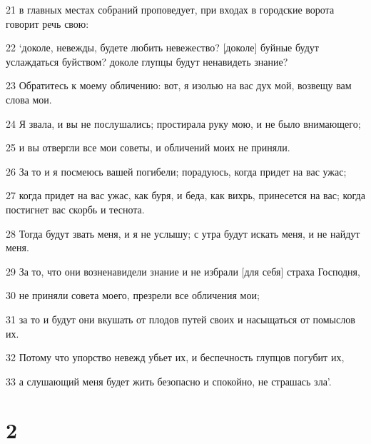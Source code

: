\par 21 в главных местах собраний проповедует, при входах в городские ворота говорит речь свою:
\par 22 `доколе, невежды, будете любить невежество? [доколе] буйные будут услаждаться буйством? доколе глупцы будут ненавидеть знание?
\par 23 Обратитесь к моему обличению: вот, я изолью на вас дух мой, возвещу вам слова мои.
\par 24 Я звала, и вы не послушались; простирала руку мою, и не было внимающего;
\par 25 и вы отвергли все мои советы, и обличений моих не приняли.
\par 26 За то и я посмеюсь вашей погибели; порадуюсь, когда придет на вас ужас;
\par 27 когда придет на вас ужас, как буря, и беда, как вихрь, принесется на вас; когда постигнет вас скорбь и теснота.
\par 28 Тогда будут звать меня, и я не услышу; с утра будут искать меня, и не найдут меня.
\par 29 За то, что они возненавидели знание и не избрали [для себя] страха Господня,
\par 30 не приняли совета моего, презрели все обличения мои;
\par 31 за то и будут они вкушать от плодов путей своих и насыщаться от помыслов их.
\par 32 Потому что упорство невежд убьет их, и беспечность глупцов погубит их,
\par 33 а слушающий меня будет жить безопасно и спокойно, не страшась зла'.

\chapter{2}

